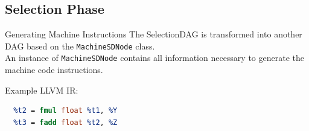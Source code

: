 \documentclass[]{beamer}
\begin{document}
\subsection{Selection Phase}

\begin{frame}[fragile]{Generating Machine Instructions}
The SelectionDAG is transformed into another DAG based on the \lstinline[language=c++]{MachineSDNode} class.\\
An instance of \lstinline[language=c++]{MachineSDNode} contains all information 
necessary to generate the machine code instructions.

\begin{block}{Example LLVM IR:}
\begin{lstlisting}[language=LLVM,gobble=4]
  %t1 = fadd float %W, %X
  %t2 = fmul float %t1, %Y
  %t3 = fadd float %t2, %Z
\end{lstlisting}
\end{block}
\end{frame}
\end{document}
